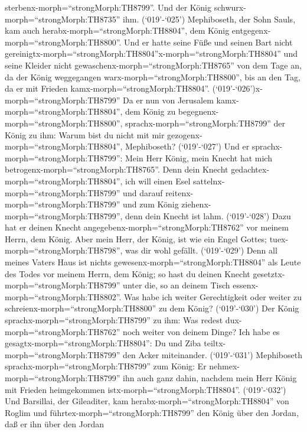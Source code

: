 sterbenx-morph=``strongMorph:TH8799''. Und der König
schwurx-morph=``strongMorph:TH8735'' ihm.  (`019'-`025')
Mephiboseth, der Sohn Sauls, kam auch
herabx-morph=``strongMorph:TH8804'', dem König
entgegenx-morph=``strongMorph:TH8800''. Und er hatte seine Füße und
seinen Bart nicht
gereinigtx-morph=``strongMorph:TH8804''x-morph=``strongMorph:TH8804''
und seine Kleider nicht gewaschenx-morph=``strongMorph:TH8765'' von dem
Tage an, da der König weggegangen warx-morph=``strongMorph:TH8800'', bis
an den Tag, da er mit Frieden kamx-morph=``strongMorph:TH8804''.
 (`019'-`026')x-morph=``strongMorph:TH8799'' Da er nun von
Jerusalem kamx-morph=``strongMorph:TH8804'', dem König zu
begegnenx-morph=``strongMorph:TH8800'',
sprachx-morph=``strongMorph:TH8799'' der König zu ihm: Warum bist du
nicht mit mir gezogenx-morph=``strongMorph:TH8804'', Mephiboseth?
 (`019'-`027') Und er sprachx-morph=``strongMorph:TH8799'':
Mein Herr König, mein Knecht hat mich
betrogenx-morph=``strongMorph:TH8765''. Denn dein Knecht
gedachtex-morph=``strongMorph:TH8804'', ich will einen Esel
sattelnx-morph=``strongMorph:TH8799'' und darauf
reitenx-morph=``strongMorph:TH8799'' und zum König
ziehenx-morph=``strongMorph:TH8799'', denn dein Knecht ist lahm.
 (`019'-`028') Dazu hat er deinen Knecht
angegebenx-morph=``strongMorph:TH8762'' vor meinem Herrn, dem König.
Aber mein Herr, der König, ist wie ein Engel Gottes;
tuex-morph=``strongMorph:TH8798'', was dir wohl gefällt. 
(`019'-`029') Denn all meines Vaters Haus ist nichts
gewesenx-morph=``strongMorph:TH8804'' als Leute des Todes vor meinem
Herrn, dem König; so hast du deinen Knecht
gesetztx-morph=``strongMorph:TH8799'' unter die, so an deinem Tisch
essenx-morph=``strongMorph:TH8802''. Was habe ich weiter Gerechtigkeit
oder weiter zu schreienx-morph=``strongMorph:TH8800'' zu dem König?
 (`019'-`030') Der König
sprachx-morph=``strongMorph:TH8799'' zu ihm: Was redest
dux-morph=``strongMorph:TH8762'' noch weiter von deinem Dinge? Ich habe
es gesagtx-morph=``strongMorph:TH8804'': Du und Ziba
teiltx-morph=``strongMorph:TH8799'' den Acker miteinander. 
(`019'-`031') Mephiboseth sprachx-morph=``strongMorph:TH8799'' zum
König: Er nehmex-morph=``strongMorph:TH8799'' ihn auch ganz dahin,
nachdem mein Herr König mit Frieden heimgekommen
istx-morph=``strongMorph:TH8804''.  (`019'-`032') Und
Barsillai, der Gileaditer, kam herabx-morph=``strongMorph:TH8804'' von
Roglim und führtex-morph=``strongMorph:TH8799'' den König über den
Jordan, daß er ihn über den Jordan
